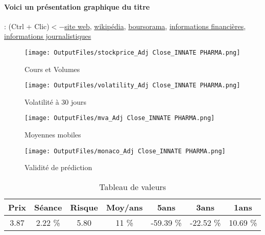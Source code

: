 \documentclass[11pt,a4paper]{report}%
\begin{document}
\paragraph{Voici un présentation graphique du titre} : (Ctrl + Clic)$<-$\href{https://www.innate-pharma.com/fr}{site web}, \href{https://fr.wikipedia.org/wiki/Innate_Pharma}{wikipédia}, \href{https://www.boursorama.com/cours/1rPIPH}{boursorama}, \href{https://www.qwant.com/?q=site:https:%2f%2fwww.easybourse.com%2faction-societe%2fINNATE-PHARMA&t=web&client=ext-firefox-hp}{informations financières}, \href{https://bourse.lerevenu.com/cours-de-bourse/fiche-valeur-synthese/INNATE-PHARMA/IPH-FR}{informations journalistiques}
\begin{figure}[!htb]
   \begin{minipage}{0.5\textwidth}
     \centering
     \texttt{[image: OutputFiles/stockprice\_Adj Close\_INNATE PHARMA.png]}
     \caption{Cours et Volumes}\label{Fig:price_INNATE PHARMA}
   \end{minipage}\hfill
   \begin{minipage}{0.5\textwidth}
     \centering
     \texttt{[image: OutputFiles/volatility\_Adj Close\_INNATE PHARMA.png]}
     \caption{Volatilité à 30 jours}\label{Fig:volat_INNATE PHARMA}
   \end{minipage}
\end{figure}
\begin{figure}[!htb]
   \begin{minipage}{0.5\textwidth}
     \centering
     \texttt{[image: OutputFiles/mva\_Adj Close\_INNATE PHARMA.png]}
     \caption{Moyennes mobiles}\label{Fig:mva_INNATE PHARMA}
   \end{minipage}\hfill
   \begin{minipage}{0.5\textwidth}
     \centering
     \texttt{[image: OutputFiles/monaco\_Adj Close\_INNATE PHARMA.png]}
     \caption{Validité de prédiction}\label{Fig:prediction_INNATE PHARMA}
   \end{minipage}
\end{figure}

\begin{table}[H]
  \centering
    \begin{tabular}{|c|c|c|c|c|c|c|}
    \hline
    Prix & Séance & Risque  & Moy/ans & 5ans & 3ans & 1ans \\
    \hline
    3.87 &    2.22 \%    & 5.80 & 11 \% & -59.39 \% & -22.52 \% & 10.69 \% \\
    \hline
    \end{tabular}%
        \label{tab:table_INNATE PHARMA}%
      \caption{Tableau de valeurs}
\end{table}%
\end{document}
